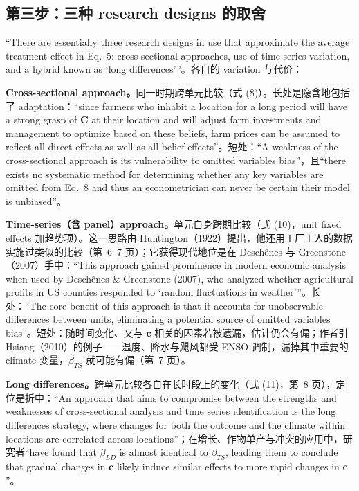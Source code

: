 \subsection{第三步：三种 research designs 的取舍}

``There are essentially three research designs in use that approximate the average treatment effect in Eq.~5: cross-sectional approaches, use of time-series variation, and a hybrid known as `long differences'''\citep[第~5 页]{hsiang2016climate}。各自的 variation 与代价：

\textbf{Cross-sectional approach。}同一时期跨单元比较（式 (8)）。长处是隐含地包括了 adaptation：``since farmers who inhabit a location for a long period will have a strong grasp of $\mathbf{C}$ at their location and will adjust farm investments and management to optimize based on these beliefs, farm prices can be assumed to reflect all direct effects as well as all belief effects''\citep[第~5 页；此处在原文中即对 Mendelsohn 等 1994 农地价值路线的概括]{hsiang2016climate}。短处：``A weakness of the cross-sectional approach is its vulnerability to omitted variables bias''\citep[第~5 页]{hsiang2016climate}，且``there exists no systematic method for determining whether any key variables are omitted from Eq.~8 and thus an econometrician can never be certain their model is unbiased''\citep[第~5 页]{hsiang2016climate}。

\textbf{Time-series（含 panel）approach。}单元自身跨期比较（式 (10)，unit fixed effects 加趋势项）。这一思路由 Huntington（1922）提出，他还用工厂工人的数据实施过类似的比较（第~6--7 页）；它获得现代地位是在 Deschênes 与 Greenstone（2007）手中：``This approach gained prominence in modern economic analysis when used by Deschênes \& Greenstone (2007), who analyzed whether agricultural profits in US counties responded to `random fluctuations in weather'''\citep[第~7 页]{hsiang2016climate}。长处：``The core benefit of this approach is that it accounts for unobservable differences between units, eliminating a potential source of omitted variables bias''\citep[第~7 页]{hsiang2016climate}。短处：随时间变化、又与 $\mathbf{c}$ 相关的因素若被遗漏，估计仍会有偏；作者引 Hsiang（2010）的例子——温度、降水与飓风都受 ENSO 调制，漏掉其中重要的 climate 变量，$\hat\beta_{TS}$ 就可能有偏（第~7 页）。

\textbf{Long differences。}跨单元比较各自在长时段上的变化（式 (11)，第~8 页），定位是折中：``An approach that aims to compromise between the strengths and weaknesses of cross-sectional analysis and time series identification is the long differences strategy, where changes for both the outcome and the climate within locations are correlated across locations''\citep[第~7 页]{hsiang2016climate}；在增长、作物单产与冲突的应用中，研究者``have found that $\beta_{LD}$ is almost identical to $\beta_{TS}$, leading them to conclude that gradual changes in $\mathbf{c}$ likely induce similar effects to more rapid changes in $\mathbf{c}$''\citep[第~8 页，指 Dell et al. 2012、Burke \& Emerick、Lobell \& Asner 2003、Burke et al. 2015b 等的应用]{hsiang2016climate}。

